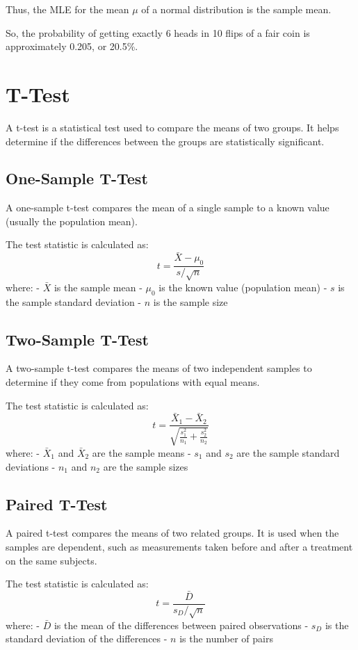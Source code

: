 \documentclass{article}
\begin{document}
Thus, the MLE for the mean \(\mu\) of a normal distribution is the sample mean.

So, the probability of getting exactly 6 heads in 10 flips of a fair coin is approximately 0.205, or 20.5\%.

\section{T-Test}
A t-test is a statistical test used to compare the means of two groups. It helps determine if the differences between the groups are statistically significant.

\subsection{One-Sample T-Test}
A one-sample t-test compares the mean of a single sample to a known value (usually the population mean).

The test statistic is calculated as:
\[
t = \frac{\bar{X} - \mu_0}{s / \sqrt{n}}
\]
where:
- \(\bar{X}\) is the sample mean
- \(\mu_0\) is the known value (population mean)
- \(s\) is the sample standard deviation
- \(n\) is the sample size

\subsection{Two-Sample T-Test}
A two-sample t-test compares the means of two independent samples to determine if they come from populations with equal means.

The test statistic is calculated as:
\[
t = \frac{\bar{X}_1 - \bar{X}_2}{\sqrt{\frac{s_1^2}{n_1} + \frac{s_2^2}{n_2}}}
\]
where:
- \(\bar{X}_1\) and \(\bar{X}_2\) are the sample means
- \(s_1\) and \(s_2\) are the sample standard deviations
- \(n_1\) and \(n_2\) are the sample sizes

\subsection{Paired T-Test}
A paired t-test compares the means of two related groups. It is used when the samples are dependent, such as measurements taken before and after a treatment on the same subjects.

The test statistic is calculated as:
\[
t = \frac{\bar{D}}{s_D / \sqrt{n}}
\]
where:
- \(\bar{D}\) is the mean of the differences between paired observations
- \(s_D\) is the standard deviation of the differences
- \(n\) is the number of pairs
\end{document}
